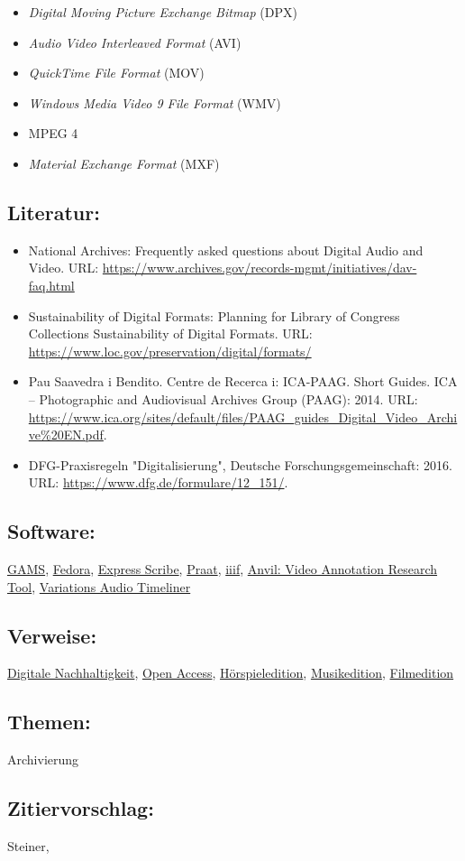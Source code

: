 \documentclass{article}
\begin{document}
        \begin{itemize}\item {\emph{Digital Moving Picture Exchange Bitmap} (DPX)}\item {\emph{Audio Video Interleaved Format} (AVI)}\item {\emph{QuickTime File Format }(MOV)}\item {\emph{Windows Media Video 9 File Format }(WMV)}\item {MPEG 4}\item {\emph{Material Exchange Format} (MXF)}\end{itemize}\subsection*{Literatur:}\begin{itemize}\item National Archives: Frequently asked questions about Digital Audio and Video. URL: \url{https://www.archives.gov/records-mgmt/initiatives/dav-faq.html}\item Sustainability of Digital Formats: Planning for Library of Congress Collections Sustainability of Digital Formats. URL: \url{https://www.loc.gov/preservation/digital/formats/}\item Pau Saavedra i Bendito. Centre de Recerca i: ICA-PAAG. Short Guides. ICA – Photographic and Audiovisual Archives Group (PAAG): 2014. URL: \url{https://www.ica.org/sites/default/files/PAAG_guides_Digital_Video_Archive%20EN.pdf}.\item DFG-Praxisregeln "Digitalisierung", Deutsche Forschungsgemeinschaft: 2016. URL: \url{https://www.dfg.de/formulare/12_151/}.\end{itemize}\subsection*{Software:}\href{http://gams.uni-graz.at/archive/objects/o:gams.doku/methods/sdef:TEI/get?locale=de}{GAMS}, \href{https://duraspace.org/fedora/}{Fedora}, \href{https://www.nch.com.au/scribe/index.html}{Express Scribe}, \href{http://www.fon.hum.uva.nl/praat/}{Praat}, \href{https://iiif.io/}{iiif}, \href{https://www.anvil-software.org}{Anvil: Video Annotation Research Tool}, \href{https://github.com/digirati-co-uk/timeliner}{Variations Audio Timeliner}\subsection*{Verweise:}\href{https://gams.uni-graz.at/o:konde.6}{Digitale Nachhaltigkeit}, \href{https://gams.uni-graz.at/o:konde.152}{Open Access}, \href{https://gams.uni-graz.at/o:konde.95}{Hörspieledition}, \href{https://gams.uni-graz.at/o:konde.139}{Musikedition}, \href{https://gams.uni-graz.at/o:konde.85}{Filmedition}\subsection*{Themen:}Archivierung\subsection*{Zitiervorschlag:}Steiner, 
\end{document}
